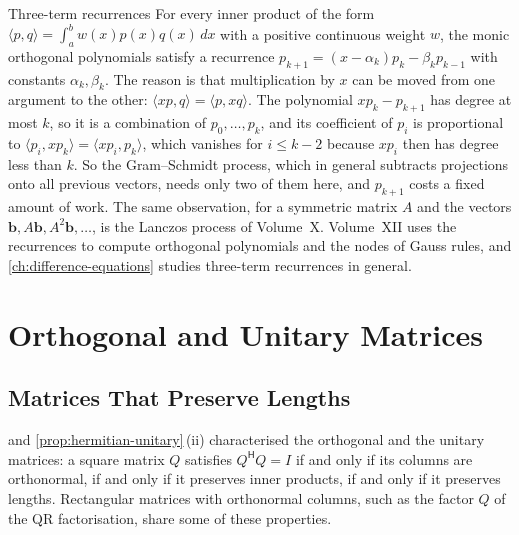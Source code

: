 \begin{note}{Three-term recurrences}
For every inner product of the form $\langle p,q\rangle=\int_a^bw(x)p(x)q(x)\,dx$ with a positive continuous weight $w$, the monic orthogonal polynomials satisfy a recurrence $p_{k+1}=(x-\alpha_k)p_k-\beta_kp_{k-1}$ with constants $\alpha_k,\beta_k$. The reason is that multiplication by $x$ can be moved from one argument to the other: $\langle xp,q\rangle=\langle p,xq\rangle$. The polynomial $xp_k-p_{k+1}$ has degree at most $k$, so it is a combination of $p_0,\ldots,p_k$, and its coefficient of $p_i$ is proportional to $\langle p_i,xp_k\rangle=\langle xp_i,p_k\rangle$, which vanishes for $i\le k-2$ because $xp_i$ then has degree less than $k$. So the Gram--Schmidt process, which in general subtracts projections onto all previous vectors, needs only two of them here, and $p_{k+1}$ costs a fixed amount of work. The same observation, for a symmetric matrix $A$ and the vectors $\mathbf b,A\mathbf b,A^2\mathbf b,\ldots$, is the Lanczos process of Volume~X. Volume~XII uses the recurrences to compute orthogonal polynomials and the nodes of Gauss rules, and \cref{ch:difference-equations} studies three-term recurrences in general.
\end{note}

\section{Orthogonal and Unitary Matrices}
\label{sec:unitary-matrices}

\subsection{Matrices That Preserve Lengths}

 and \cref{prop:hermitian-unitary}\,(ii) characterised the orthogonal and the unitary matrices: a square matrix $Q$ satisfies $Q^{\mathsf H}Q=I$ if and only if its columns are orthonormal, if and only if it preserves inner products, if and only if it preserves lengths. Rectangular matrices with orthonormal columns, such as the factor $Q$ of the QR factorisation, share some of these properties.

